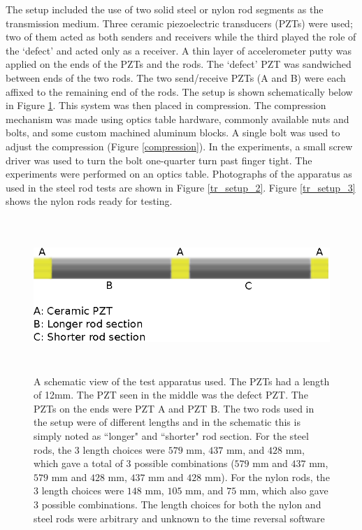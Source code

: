 \documentclass[11pt,letterpaper]{article}%
\begin{document}
The setup included the use of two solid steel or nylon rod segments as the transmission medium. Three ceramic piezoelectric
transducers (PZTs) were used; two of them acted as both senders and
receivers while the third played the role of the `defect' and acted
only as a receiver. A thin layer of accelerometer putty was applied on the ends of the PZTs and the rods. The `defect' PZT was sandwiched between ends of
the two rods. The two send/receive PZTs (A and B) were each affixed to the remaining end of the rods. The setup is shown schematically below in
Figure \ref{tr_setup_1}. This system was then
placed in compression. The compression mechanism was made using optics table hardware, commonly available nuts and bolts, and some custom machined aluminum blocks. A single bolt was used to adjust the compression (Figure \ref{compression}). In the experiments, a small screw driver was used to turn the bolt one-quarter turn past finger tight. The experiments were performed on an optics table. Photographs of the apparatus as used in
the steel rod tests are shown in Figure \ref{tr_setup_2}. Figure \ref{tr_setup_3} shows the nylon rods ready for testing. 

\begin{figure}
\begin{center}
\includegraphics[width=13cm,height=5.8cm]{tr_dimensions.eps}
\end{center}
 \caption[des1]
   { \label{tr_setup_1}
A schematic view of the test apparatus used. The PZTs had a length of 12mm. The PZT seen in the middle was the defect PZT. The PZTs on the ends were PZT A and PZT B. The two rods used in the setup were of different lengths and in the schematic this is simply noted as ``longer" and ``shorter" rod section. For the steel rods, the 3 length choices were $579$ mm, $437$ mm, and $428$ mm, which gave a total of 3 possible combinations ($579$ mm and $437$ mm, $579$ mm and $428$ mm, $437$ mm and $428$ mm). For the nylon rods, the 3 length choices were $148$ mm, $105$ mm, and $75$ mm, which also gave 3 possible combinations. The length choices for both the nylon and steel rods were arbitrary and unknown to the time reversal software }
\end{figure}
\end{document}

